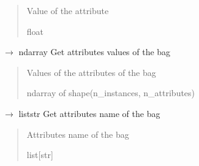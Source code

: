 \documentclass[letterpaper,10pt,english]{sphinxmanual}
\begin{document}
\begin{fulllineitems}
\begin{fulllineitems}
\begin{quote}
\begin{description}
\sphinxAtStartPar
{} \textendash{} Value of the attribute

\sphinxAtStartPar
float

\end{description}\end{quote}

\end{fulllineitems}


\begin{fulllineitems}
\label{\detokenize{data/_autosummary/miml.data.bag.Bag:miml.data.bag.Bag.get_attributes}}
\pysigstartsignatures
\pysiglinewithargsret
{}
{}
{{ $\rightarrow$ ndarray}}
\pysigstopsignatures
\sphinxAtStartPar
Get attributes values of the bag
\begin{quote}\begin{description}
\sphinxAtStartPar
{} \textendash{} Values of the attributes of the bag

\sphinxAtStartPar
ndarray of shape(n\_instances, n\_attributes)

\end{description}\end{quote}

\end{fulllineitems}


\begin{fulllineitems}
\label{\detokenize{data/_autosummary/miml.data.bag.Bag:miml.data.bag.Bag.get_attributes_name}}
\pysigstartsignatures
\pysiglinewithargsret
{}
{}
{{ $\rightarrow$ list\DUrole{p}{{[}}str\DUrole{p}{{]}}}}
\pysigstopsignatures
\sphinxAtStartPar
Get attributes name of the bag
\begin{quote}\begin{description}
\sphinxAtStartPar
{} \textendash{} Attributes name of the bag

\sphinxAtStartPar
list{[}str{]}


\end{description}
\end{quote}
\end{fulllineitems}
\end{fulllineitems}
\end{document}
